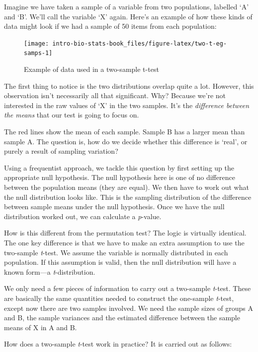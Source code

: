 \documentclass[
]{book}
\begin{document}
Imagine we have taken a sample of a variable from two populations, labelled `A' and `B'. We'll call the variable `X' again. Here's an example of how these kinds of data might look if we had a sample of 50 items from each population:

\begin{figure}

{\centering \texttt{[image: intro-bio-stats-book\_files/figure-latex/two-t-eg-samps-1]} 

}

\caption{Example of data used in a two-sample t-test}\label{fig:two-t-eg-samps}
\end{figure}

The first thing to notice is the two distributions overlap quite a lot. However, this observation isn't necessarily all that significant. Why? Because we're not interested in the raw values of `X' in the two samples. It's the \emph{difference between the means} that our test is going to focus on.

The red lines show the mean of each sample. Sample B has a larger mean than sample A. The question is, how do we decide whether this difference is `real', or purely a result of sampling variation?

Using a frequentist approach, we tackle this question by first setting up the appropriate null hypothesis. The null hypothesis here is one of no difference between the population means (they are equal). We then have to work out what the null distribution looks like. This is the sampling distribution of the difference between sample means under the null hypothesis. Once we have the null distribution worked out, we can calculate a \emph{p}-value.

How is this different from the permutation test? The logic is virtually identical. The one key difference is that we have to make an extra assumption to use the two-sample \emph{t}-test. We assume the variable is normally distributed in each population. If this assumption is valid, then the null distribution will have a known form---a \emph{t}-distribution.

We only need a few pieces of information to carry out a two-sample \emph{t}-test. These are basically the same quantities needed to construct the one-sample \emph{t}-test, except now there are two samples involved. We need the sample sizes of groups A and B, the sample variances and the estimated difference between the sample means of X in A and B.

How does a two-sample \emph{t}-test work in practice? It is carried out as follows:
\end{document}
